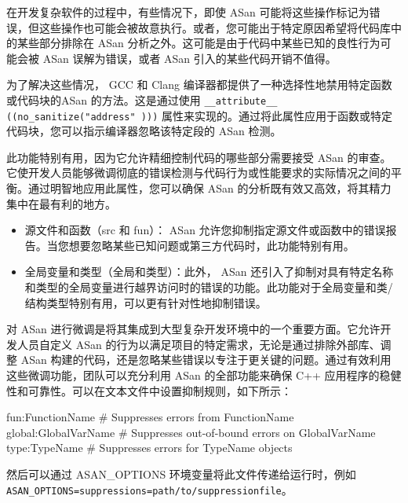 在开发复杂软件的过程中，有些情况下，即使 ASan 可能将这些操作标记为错误，但这些操作也可能会被故意执行。或者，您可能出于特定原因希望将代码库中的某些部分排除在 ASan 分析之外。这可能是由于代码中某些已知的良性行为可能会被 ASan 误解为错误，或者 ASan 引入的某些代码开销不值得。

为了解决这些情况， GCC 和 Clang 编译器都提供了一种选择性地禁用特定函数或代码块的ASan 的方法。这是通过使用 \verb|__attribute__ ((no_sanitize("address" )))| 属性来实现的。通过将此属性应用于函数或特定代码块，您可以指示编译器忽略该特定段的 ASan 检测。

此功能特别有用，因为它允许精细控制代码的哪些部分需要接受 ASan 的审查。它使开发人员能够微调彻底的错误检测与代码行为或性能要求的实际情况之间的平衡。通过明智地应用此属性，您可以确保 ASan 的分析既有效又高效，将其精力集中在最有利的地方。


\begin{itemize}
\item
源文件和函数（src 和 fun）： ASan 允许您抑制指定源文件或函数中的错误报告。当您想要忽略某些已知问题或第三方代码时，此功能特别有用。

\item
全局变量和类型（全局和类型）：此外， ASan 还引入了抑制对具有特定名称和类型的全局变量进行越界访问时的错误的功能。此功能对于全局变量和类/结构类型特别有用，可以更有针对性地抑制错误。
\end{itemize}


对 ASan 进行微调是将其集成到大型复杂开发环境中的一个重要方面。它允许开发人员自定义 ASan 的行为以满足项目的特定需求，无论是通过排除外部库、调整 ASan 构建的代码，还是忽略某些错误以专注于更关键的问题。通过有效利用这些微调功能，团队可以充分利用 ASan 的全部功能来确保 C++ 应用程序的稳健性和可靠性。可以在文本文件中设置抑制规则，如下所示：

\begin{shell}
fun:FunctionName # Suppresses errors from FunctionName
global:GlobalVarName # Suppresses out-of-bound errors on GlobalVarName
type:TypeName # Suppresses errors for TypeName objects
\end{shell}

然后可以通过 ASAN\_OPTIONS 环境变量将此文件传递给运行时，例如 \verb|ASAN_OPTIONS=suppressions=path/to/suppressionfile|。


